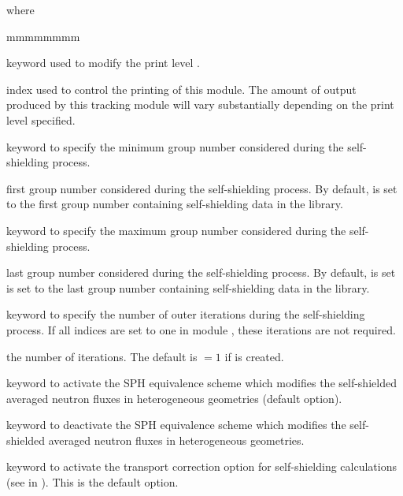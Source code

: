 \noindent where

\begin{ListeDeDescription}{mmmmmmmm}

\item[\moc{EDIT}] keyword used to modify the print level .

\item[\dusa{iprint}] index used to control the printing of this module. The
amount of output produced by this tracking module will vary substantially
depending on the print level specified. 

\item[\moc{GRMIN}] keyword to specify the minimum group number considered
during the self-shielding process.

\item[\dusa{lgrmin}] first group number considered during the
self-shielding process. By default,  is set to the first group
number containing self-shielding data in the library.

\item[\moc{GRMAX}]  keyword to specify the maximum group number considered
during the self-shielding process.

\item[\dusa{lgrmax}] last group number considered during the self-shielding
process. By default,  is set is set to the last group
number containing self-shielding data in the library.

\item[\moc{PASS}]  keyword to specify the number of outer iterations during
the self-shielding process. If all  indices are set to one in module ,
these iterations are not required.

\item[\dusa{ipass}] the number of iterations. The default is  $=1$ if
 is created.

\item[\moc{SPH}] keyword to activate the SPH equivalence scheme which
modifies the self-shielded averaged neutron fluxes in
heterogeneous geometries (default option).

\item[\moc{NOSP}] keyword to deactivate the SPH equivalence scheme which
modifies the self-shielded averaged neutron fluxes in heterogeneous geometries.

\item[\moc{TRAN}] keyword to activate the transport correction option for
self-shielding calculations (see  in ). This
is the default option.


\end{ListeDeDescription}
